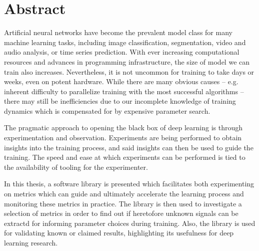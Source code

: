 \chapter*{Abstract}

Artificial neural networks have become the prevalent model class for many
machine learning tasks, including image classification, segmentation, video and
audio analysis, or time series prediction. With ever increasing computational
resources and advances in programming infrastructure, the size of model we can
train also increases. Nevertheless, it is not uncommon for training to take days
or weeks, even on potent hardware. While there are many obvious causes -- e.g.
inherent difficulty to parallelize training with the most successful algorithms
-- there may still be inefficiencies due to our incomplete knowledge of training
dynamics which is compensated for by expensive parameter search.

The pragmatic approach to opening the black box of deep learning is
through experimentation and observation. Experiments are being performed to
obtain insights into the training process, and said insights can then be used to
guide the training.  The speed and ease at which experiments can be performed is
tied to the availability of tooling for the experimenter.

In this thesis, a software library is presented which facilitates both
experimenting on metrics which can guide and ultimately accelerate the learning
process and monitoring these metrics in practice. The library is then used to
investigate a selection of metrics in order to find out if heretofore unknown
signals can be extractd for informing parameter choices during training. Also,
the library is used for validating known or claimed results, highlighting its
usefulness for deep learning research.
